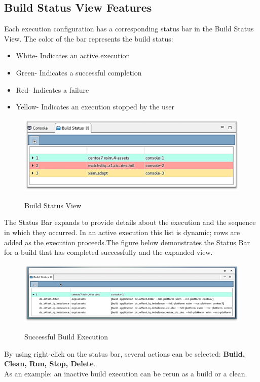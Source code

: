 \documentclass[10pt, a4paper, oneside]{article}
\begin{document}
\subsection{Build Status View Features}
Each execution configuration has a corresponding status bar in the Build Status View. The color of the bar represents the build status:
\begin{itemize}
\item White- Indicates an active execution
\item Green- Indicates a successful completion
\item Red- Indicates a failure
\item Yellow- Indicates an execution stopped by the user
\end{itemize}
\begin{figure}[h!]
    \centering
    \caption{Build Status View}
    \includegraphics[width=.95\textwidth]{BuildStatusViewFeatures.png}
      \label{fig:Build Status View}
\end{figure}
The Status Bar expands to provide details about the execution and the sequence in which they occurred. In an active execution this list is dynamic; rows are added as the execution proceeds.The figure below demonstrates the Status Bar for a build that has completed successfully and the expanded view.
\begin{figure}[h!]
    \centering
    \caption{Successful Build Execution}
    \includegraphics[width=.95\textwidth]{SuccessfulBuildExecution.png}
    \label{fig:Expanded View of Successful Build Execution}
\end{figure}

By using right-click on the status bar, several actions can be selected: \textbf{Build, Clean, Run, Stop, Delete}.\\ As an example: an inactive build execution can be rerun as a build or a clean.\\
\end{document}
